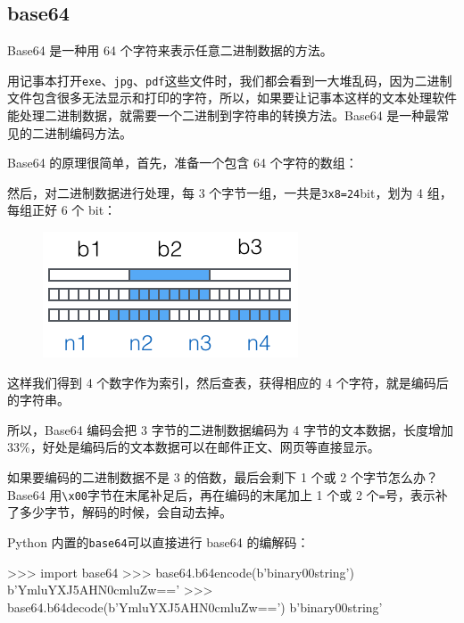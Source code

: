 \hypertarget{base64}{%
\subsection{base64}\label{base64}}

Base64 是一种用 64 个字符来表示任意二进制数据的方法。

用记事本打开\texttt{exe}、\texttt{jpg}、\texttt{pdf}这些文件时，我们都会看到一大堆乱码，因为二进制文件包含很多无法显示和打印的字符，所以，如果要让记事本这样的文本处理软件能处理二进制数据，就需要一个二进制到字符串的转换方法。Base64
是一种最常见的二进制编码方法。

Base64 的原理很简单，首先，准备一个包含 64 个字符的数组：

\begin{pythoncode}
['A', 'B', 'C', ... 'a', 'b', 'c', ... '0', '1', ... '+', '/']
\end{pythoncode}

然后，对二进制数据进行处理，每 3
个字节一组，一共是\texttt{3x8=24}bit，划为 4 组，每组正好 6 个 bit：

 
 \begin{figure}[htp]
	\centering
	\includegraphics[width=0.6\linewidth]{fig/949444125467040.png}
\end{figure}


这样我们得到 4 个数字作为索引，然后查表，获得相应的 4
个字符，就是编码后的字符串。

所以，Base64 编码会把 3 字节的二进制数据编码为 4
字节的文本数据，长度增加
33\%，好处是编码后的文本数据可以在邮件正文、网页等直接显示。

如果要编码的二进制数据不是 3 的倍数，最后会剩下 1 个或 2
个字节怎么办？Base64
用\texttt{\textbackslash{}x00}字节在末尾补足后，再在编码的末尾加上 1
个或 2 个\texttt{=}号，表示补了多少字节，解码的时候，会自动去掉。

Python 内置的\texttt{base64}可以直接进行 base64 的编解码：

\begin{pythoncode}
>>> import base64
>>> base64.b64encode(b'binary\x00string')
b'YmluYXJ5AHN0cmluZw=='
>>> base64.b64decode(b'YmluYXJ5AHN0cmluZw==')
b'binary\x00string'
\end{pythoncode}


